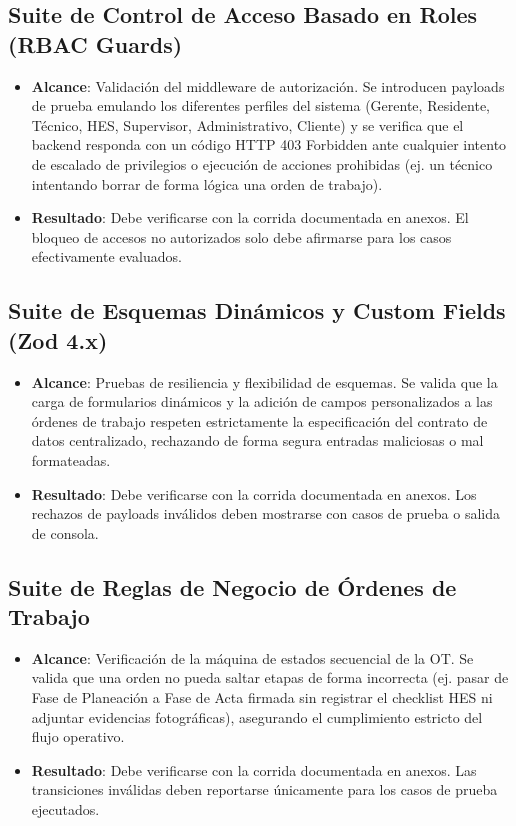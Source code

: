 \subsection{Suite de Control de Acceso Basado en Roles (RBAC Guards)}
\begin{itemize}
    \item \textbf{Alcance}: Validación del middleware de autorización. Se introducen payloads de prueba emulando los diferentes perfiles del sistema (Gerente, Residente, Técnico, HES, Supervisor, Administrativo, Cliente) y se verifica que el backend responda con un código HTTP 403 Forbidden ante cualquier intento de escalado de privilegios o ejecución de acciones prohibidas (ej. un técnico intentando borrar de forma lógica una orden de trabajo).
    \item \textbf{Resultado}: Debe verificarse con la corrida documentada en anexos. El bloqueo de accesos no autorizados solo debe afirmarse para los casos efectivamente evaluados.
\end{itemize}

\subsection{Suite de Esquemas Dinámicos y Custom Fields (Zod 4.x)}
\begin{itemize}
    \item \textbf{Alcance}: Pruebas de resiliencia y flexibilidad de esquemas. Se valida que la carga de formularios dinámicos y la adición de campos personalizados a las órdenes de trabajo respeten estrictamente la especificación del contrato de datos centralizado, rechazando de forma segura entradas maliciosas o mal formateadas.
    \item \textbf{Resultado}: Debe verificarse con la corrida documentada en anexos. Los rechazos de payloads inválidos deben mostrarse con casos de prueba o salida de consola.
\end{itemize}

\subsection{Suite de Reglas de Negocio de Órdenes de Trabajo}
\begin{itemize}
    \item \textbf{Alcance}: Verificación de la máquina de estados secuencial de la OT. Se valida que una orden no pueda saltar etapas de forma incorrecta (ej. pasar de Fase de Planeación a Fase de Acta firmada sin registrar el checklist HES ni adjuntar evidencias fotográficas), asegurando el cumplimiento estricto del flujo operativo.
    \item \textbf{Resultado}: Debe verificarse con la corrida documentada en anexos. Las transiciones inválidas deben reportarse únicamente para los casos de prueba ejecutados.
\end{itemize}

